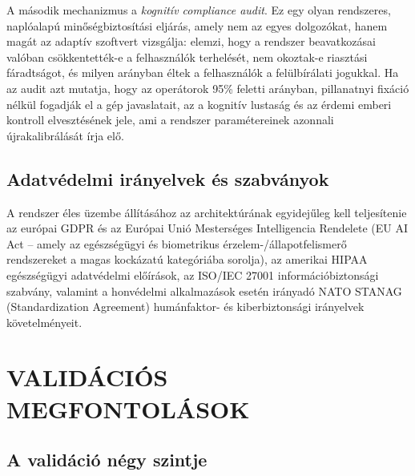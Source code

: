 \documentclass[12pt,a4paper,oneside]{book}
\begin{document}
A második mechanizmus a \emph{kognitív compliance audit}. Ez egy olyan rendszeres, naplóalapú minőségbiztosítási eljárás, amely nem az egyes dolgozókat, hanem magát az adaptív szoftvert vizsgálja: elemzi, hogy a rendszer beavatkozásai valóban csökkentették-e a felhasználók terhelését, nem okoztak-e riasztási fáradtságot, és milyen arányban éltek a felhasználók a felülbírálati jogukkal. Ha az audit azt mutatja, hogy az operátorok 95\% feletti arányban, pillanatnyi fixáció nélkül fogadják el a gép javaslatait, az a kognitív lustaság \cite{tanveer2026} és az érdemi emberi kontroll elvesztésének jele, ami a rendszer paramétereinek azonnali újrakalibrálását írja elő.

\subsection{Adatvédelmi irányelvek és szabványok}

A rendszer éles üzembe állításához az architektúrának egyidejűleg kell teljesítenie az európai GDPR és az Európai Unió Mesterséges Intelligencia Rendelete (EU AI Act -- amely az egészségügyi és biometrikus érzelem-/állapotfelismerő rendszereket a magas kockázatú kategóriába sorolja), az amerikai HIPAA egészségügyi adatvédelmi előírások, az ISO/IEC 27001 információbiztonsági szabvány, valamint a honvédelmi alkalmazások esetén irányadó NATO STANAG (Standardization Agreement) humánfaktor- és kiberbiztonsági irányelvek követelményeit.

\section{VALIDÁCIÓS MEGFONTOLÁSOK}

\subsection{A validáció négy szintje}
\end{document}
